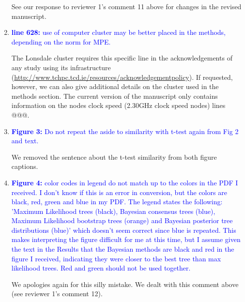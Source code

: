 \documentclass[12pt,letterpaper]{article}
\begin{document}
\begin{enumerate}
See our response to reviewer 1's comment 11 above for changes in the revised manuscript.

\item{\textcolor{blue}{\textbf{line 628:} use of computer cluster may be better placed in the methods, depending on the norm for MPE.}}

The Lonsdale cluster requires this specific line in the acknowledgements of any study using its infrastructure (\url{http://www.tchpc.tcd.ie/resources/acknowledgementpolicy}).
If requested, however, we can also give additional details on the cluster used in the methods section.
The current version of the manuscript only contains information on the nodes clock speed (2.30GHz clock speed nodes) lines @@@.

\item{\textcolor{blue}{\textbf{Figure 3:} Do not repeat the aside to similarity with t-test again from Fig 2 and text.}}

We removed the sentence about the t-test similarity from both figure captions. %

\item{\textcolor{blue}{\textbf{Figure 4:} color codes in legend do not match up to the colors in the PDF I received. I don't know if this is an error in conversion, but the colors are black, red, green and blue in my PDF. The legend states the following: 'Maximum Likelihood trees (black), Bayesian consensus trees (blue), Maximum Likelihood bootstrap trees (orange) and Bayesian posterior tree distributions (blue)' which doesn't seem correct since blue is repeated. This makes interpreting the figure difficult for me at this time, but I assume given the text in the Results that the Bayesian methods are black and red in the figure I received, indicating they were closer to the best tree than max likelihood trees. Red and green should not be used together.}}

We apologies again for this silly mistake. We dealt with this comment above (see reviewer 1's comment 12).


\end{enumerate}
\end{document}

